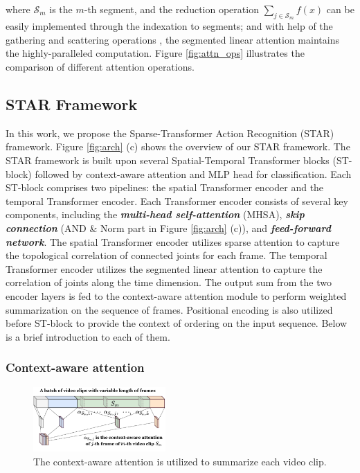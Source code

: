 \documentclass[letterpaper]{article} %
\begin{document}
where $\mathcal{S}_m$ is the $m$-th segment, and the reduction operation $\sum_{j \in \mathcal{S}_m} f(x)$ can be easily implemented through the indexation to segments; and with help of the gathering and scattering operations \cite{torch_scatter}, the segmented linear attention maintains the highly-paralleled computation. Figure \ref{fig:attn_ops} illustrates the comparison of different attention operations.

\subsection{STAR Framework} \label{sec:arch}

In this work, we propose the Sparse-Transformer Action Recognition (STAR) framework. Figure \ref{fig:arch} (c) shows the overview of our STAR framework. The STAR framework is built upon several Spatial-Temporal Transformer blocks (ST-block) followed by context-aware attention and MLP head for classification. Each ST-block comprises two pipelines: the spatial Transformer encoder and the temporal Transformer encoder. Each Transformer encoder consists of several key components, including the \textbf{\textit{multi-head self-attention}} (MHSA), \textbf{\textit{skip connection}} (AND \& Norm part in Figure \ref{fig:arch} (c)), and \textbf{\textit{feed-forward network}}. The spatial Transformer encoder utilizes sparse attention to capture the topological correlation of connected joints for each frame. The temporal Transformer encoder utilizes the segmented linear attention to capture the correlation of joints along the time dimension. The output sum from the two encoder layers is fed to the context-aware attention module to perform weighted summarization on the sequence of frames. Positional encoding is also utilized before ST-block to provide the context of ordering on the input sequence. Below is a brief introduction to each of them.

\subsubsection{Context-aware attention} \label{sec:context_attn}
\begin{figure}[ht]
    \centering
    \includegraphics[width=0.45\textwidth]{context_attn.pdf}
    \caption{The context-aware attention is utilized to summarize each video clip.}
    \label{fig:context_attn}
\end{figure}
\end{document}
